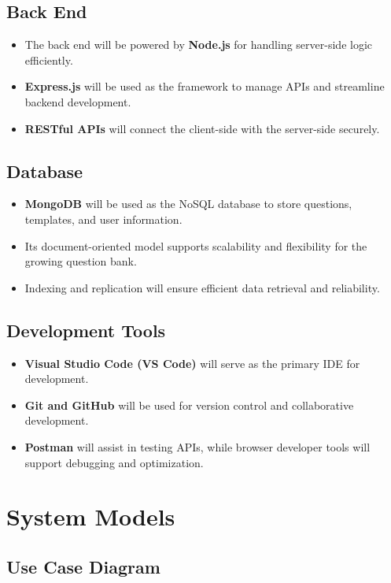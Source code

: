 \documentclass[12pt]{article}
\begin{document}
	\subsection{Back End}
	\begin{itemize}
		\item The back end will be powered by \textbf{Node.js} for handling server-side logic efficiently.
		\item \textbf{Express.js} will be used as the framework to manage APIs and streamline backend development.
		\item \textbf{RESTful APIs} will connect the client-side with the server-side securely.
	\end{itemize}
	
	\subsection{Database}
	\begin{itemize}
		\item \textbf{MongoDB} will be used as the NoSQL database to store questions, templates, and user information.
		\item Its document-oriented model supports scalability and flexibility for the growing question bank.
		\item Indexing and replication will ensure efficient data retrieval and reliability.
	\end{itemize}
	
	\subsection{Development Tools}
	\begin{itemize}
		\item \textbf{Visual Studio Code (VS Code)} will serve as the primary IDE for development.
		\item \textbf{Git and GitHub} will be used for version control and collaborative development.
		\item \textbf{Postman} will assist in testing APIs, while browser developer tools will support debugging and optimization.
	\end{itemize}
	\newpage
	\section{System Models}
	\subsection{Use Case Diagram}
	
\end{document}
